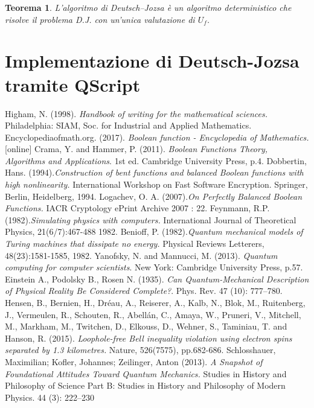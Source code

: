 \documentclass[12pt,a4paper,openright]{report}
\newtheorem{mythm}{Teorema}[chapter]
\begin{document}
\begin{mythm}
    L'algoritmo di Deutsch–Jozsa è un algoritmo deterministico che risolve il problema D.J. con un'unica valutazione di $U_f$.   
\end{mythm}

\chapter{Implementazione di Deutsch-Jozsa tramite QScript}


\begin{thebibliography}{20}
     Higham, N. (1998). \emph{Handbook of writing for the mathematical sciences.} Philadelphia: SIAM, Soc. for Industrial and Applied Mathematics.
     Encyclopediaofmath.org. (2017). \emph{Boolean function - Encyclopedia of Mathematics.} [online] 
     Crama, Y. and Hammer, P. (2011). \emph{Boolean Functions Theory, Algorithms and Applications}. 1st ed. Cambridge University Press, p.4.
     Dobbertin, Hans. (1994).\emph{Construction of bent functions and balanced Boolean functions with high nonlinearity.} International Workshop on Fast Software Encryption. Springer, Berlin, Heidelberg, 1994.
     Logachev, O. A. (2007).\emph{On Perfectly Balanced Boolean Functions.} IACR Cryptology ePrint Archive 2007 : 22.
     Feynmann, R.P. (1982).\emph{Simulating physics with computers.} International Journal of Theoretical Physics, 21(6/7):467-488 1982.
     Benioff, P. (1982).\emph{Quantum mechanical models of Turing machines that dissipate no energy.} Physical Reviews Letterers, 48(23):1581-1585, 1982.
     Yanofsky, N. and Mannucci, M. (2013). \emph{Quantum computing for computer scientists}. New York: Cambridge University Press, p.57.
     Einstein A., Podolsky B., Rosen N. (1935). \emph{Can Quantum-Mechanical Description of Physical Reality Be Considered Complete?}. Phys. Rev. 47 (10): 777–780. 
     Hensen, B., Bernien, H., Dréau, A., Reiserer, A., Kalb, N., Blok, M., Ruitenberg, J., Vermeulen, R., Schouten, R., Abellán, C., Amaya, W., Pruneri, V., Mitchell, M., Markham, M., Twitchen, D., Elkouss, D., Wehner, S., Taminiau, T. and Hanson, R. (2015). \emph{Loophole-free Bell inequality violation using electron spins separated by 1.3 kilometres.} Nature, 526(7575), pp.682-686.
     Schlosshauer, Maximilian; Kofler, Johannes; Zeilinger, Anton (2013). \emph{A Snapshot of Foundational Attitudes Toward Quantum Mechanics.} Studies in History and Philosophy of Science Part B: Studies in History and Philosophy of Modern Physics. 44 (3): 222–230

\end{thebibliography}
\end{document}
